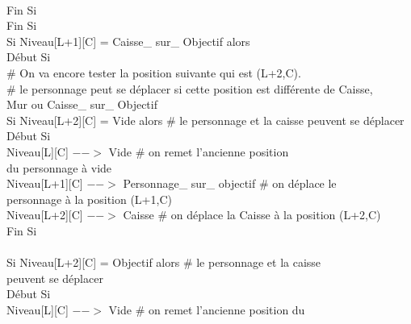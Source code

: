 \documentclass{article}
\begin{document}
\begin{tabbing}
\\	\hspace{4cm}		Fin Si
\\	\hspace{3cm}	Fin Si 
\\	\hspace{3cm}	Si Niveau[L+1][C] = Caisse\_ sur\_ Objectif alors			
\\	\hspace{3cm}	Début Si
\\	\hspace{4cm}		\# On va encore tester la position suivante qui est (L+2,C). 
\\	\hspace{4cm}		\# le personnage peut se déplacer si cette position est différente de Caisse,
\\ \hspace{4cm} Mur ou Caisse\_ sur\_ Objectif
\\	\hspace{4cm}		Si Niveau[L+2][C] = Vide alors          \# le personnage et la caisse peuvent se déplacer
\\	\hspace{4cm}		Début Si
\\	\hspace{5cm}			Niveau[L][C] $-->$ Vide 			    \# on remet l'ancienne position
\\ \hspace{5cm} du personnage à vide
\\	\hspace{5cm}			Niveau[L+1][C] $-->$ Personnage\_ sur\_ objectif    \# on déplace le
\\ \hspace{5cm} personnage à la position (L+1,C)
\\	\hspace{5cm}			Niveau[L+2][C] $-->$ Caisse		      \# on déplace la Caisse à la position (L+2,C)
\\	\hspace{4cm}		Fin Si
\\
\\	\hspace{4cm}		Si Niveau[L+2][C] = Objectif alors         		\# le personnage et la caisse 
\\ \hspace{4cm} peuvent se déplacer
\\	\hspace{4cm}		Début Si
\\	\hspace{5cm}			Niveau[L][C] $-->$ Vide 				\# on remet l'ancienne position du 

\end{tabbing}
\end{document}

